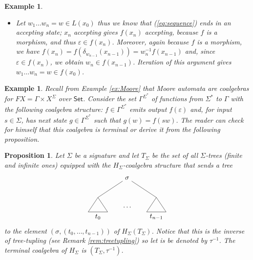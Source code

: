 \documentclass[letterpaper, 11pt, oneside]{memoir}
\theoremstyle{myteo}
\newtheorem{proposition}[theorem]{Proposition}
\newtheorem{example}[theorem]{Example}
\numberwithin{equation}{section}
\newcommand{\Set}{\textsf{Set}}
\begin{document}
\begin{example}
\begin{itemize}
    Finally since \(w \in f(x_0)\) we have \(\varepsilon \in f(x_n)\) so \(x_n\) is accepting again \(f\) is a morphism.
  \item[b.] Let \(w_1\ldots w_n = w \in L(x_0)\) thus we know that (\ref{eq:sequence}) ends in an accepting state; \(x_n\) accepting gives \(f(x_n)\) accepting, because \(f\) is a morphism, and thus \(\varepsilon \in f(x_n)\).
    Moreover, again because \(f\) is a morphism, we have \(f(x_n) = f(\delta_{w_{n-1}}(x_{n-1})) = w_n^{-1}f(x_{n-1})\) and, since \(\varepsilon \in f(x_n)\), we obtain \(w_n \in f(x_{n-1})\).
    Iteration of this argument gives \(w_1 \ldots w_n = w \in f(x_0)\).
  \end{itemize}
\end{example}

\begin{example}
  Recall from Example \ref{ex:Moore} that Moore automata are coalgebras for \(FX = \Gamma \times X^\Sigma\) over \(\Set\).
  Consider the set \(\Gamma^{\Sigma^*}\) of functions from \(\Sigma^*\) to \(\Gamma\) with the following coalgebra structure: \(f\in \Gamma^{\Sigma^*}\) emits output \(f(\varepsilon)\) and, for input \(s \in \Sigma\), has next state \(g \in \Gamma^{\Sigma^*}\) such that \(g(w) = f(sw)\).
  The reader can check for himself that this coalgebra is terminal or derive it from the following proposition.
\end{example}

\begin{proposition}
  Let \(\Sigma\) be a signature and let \(T_\Sigma\) be the set of all \(\Sigma\)-trees (finite and infinite ones) equipped with the \(H_\Sigma\)-coalgebra structure that sends a tree
  \begin{equation*}
    \begin{tikzpicture}
      \node (t1) at (0,-0.5){\(t_0\)};
      \node (t2) at (1.5,0){\(\ldots\)};
      \node (t3) at (3,-0.5){\(t_{n-1}\)};
      \node (s) at (1.5, 1.5){\(\sigma\)};
      
      \draw[-] (0,0.5) -- (.5, -.25) -- (-.5, -.25) -- (0, .5);
      \draw[-] (3,0.5) -- (3.5, -.25) -- (2.5, -.25) -- (3, .5);

      \draw[-] (s) -- (0,0.5);
      \draw[-] (s) -- (3,0.5);
    \end{tikzpicture}
  \end{equation*}
  to the element \((\sigma, (t_0, \ldots, t_{n-1}))\) of \(H_\Sigma(T_\Sigma)\).
  Notice that this is the inverse of tree-tupling (see Remark \ref{rem:treetupling}) so let is be denoted by \(\tau^{-1}\).
  The terminal coalgebra of \(H_\Sigma\) is \((T_\Sigma, \tau^{-1})\).
\end{proposition}
\end{document}
